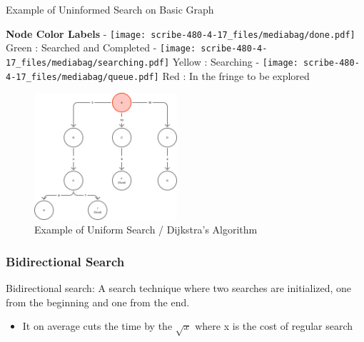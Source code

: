 \documentclass[
  letterpaper,
  DIV=11,
  numbers=noendperiod]{scrartcl}
\providecommand{\tightlist}{%
  \setlength{\itemsep}{0pt}\setlength{\parskip}{0pt}}\usepackage{longtable,booktabs,array}
\begin{document}
Example of Uninformed Search on Basic Graph

\begin{tcolorbox}[enhanced jigsaw, opacitybacktitle=0.6, title=\textcolor{quarto-callout-note-color}{\faInfo}\hspace{0.5em}{Note}, toptitle=1mm, left=2mm, breakable, titlerule=0mm, bottomtitle=1mm, bottomrule=.15mm, leftrule=.75mm, colframe=quarto-callout-note-color-frame, arc=.35mm, rightrule=.15mm, toprule=.15mm, coltitle=black, colback=white, opacityback=0, colbacktitle=quarto-callout-note-color!10!white]

\textbf{Node Color Labels} -
\texttt{[image: scribe-480-4-17\_files/mediabag/done.pdf]}
Green : Searched and Completed -
\texttt{[image: scribe-480-4-17\_files/mediabag/searching.pdf]}
Yellow : Searching -
\texttt{[image: scribe-480-4-17\_files/mediabag/queue.pdf]}
Red : In the fringe to be explored

\end{tcolorbox}

\begin{figure}[H]

{\centering \includegraphics[width=2.08333in,height=\textheight,keepaspectratio]{./Dijakestria.gif}

}

\caption{Example of Uniform Search / Dijkstra's Algorithm}

\end{figure}%

\subsubsection{Bidirectional Search}\label{bidirectional-search}

Bidirectional search: A search technique where two searches are
initialized, one from the beginning and one from the end.

\begin{itemize}
\tightlist
\item
  It on average cuts the time by the \(\sqrt{x}\) where x is the cost of
  regular search
\end{itemize}
\end{document}

